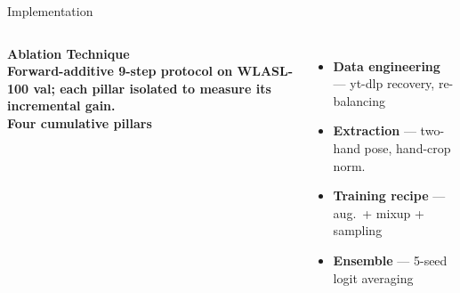 \documentclass[aspectratio=169,11pt]{beamer}
\begin{document}
\begin{frame}{Implementation}
\begin{columns}[T,onlytextwidth]
      \scriptsize\bfseries\color{Teal}Ablation Technique\\[2pt]
      \scriptsize
      Forward-additive 9-step protocol on WLASL-100 val; each pillar isolated to measure its incremental gain.\\[4pt]

      \textbf{\color{TealDark}Four cumulative pillars}\\[1pt]
      \begin{itemize}\setlength{\itemsep}{1pt}\setlength{\topsep}{0pt}\setlength{\leftskip}{-8pt}
        \item \textbf{Data engineering} --- yt-dlp recovery, re-balancing
        \item \textbf{Extraction} --- two-hand pose, hand-crop norm.
        \item \textbf{Training recipe} --- aug.\ + mixup + sampling
        \item \textbf{Ensemble} --- 5-seed logit averaging
      \end{itemize}
      \vspace{3pt}

  \end{columns}
\end{frame}
\end{document}
